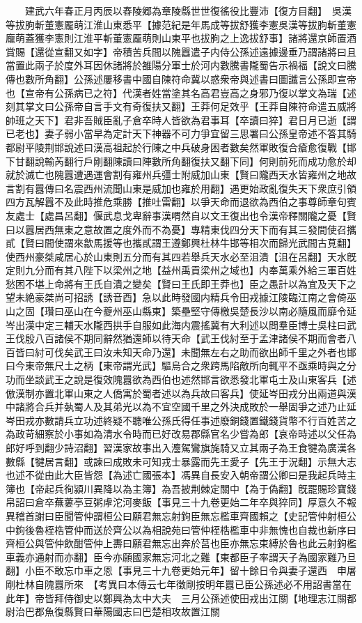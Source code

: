 　　建武六年春正月丙辰以舂陵郷為章陵縣世世復徭役比豐沛【復方目翻】　吳漢等拔胊斬董憲龎萌江淮山東悉平【據范紀是年馬成等拔舒獲李憲吳漢等拔朐斬董憲龐萌蓋獲李憲則江淮平斬董憲龎萌則山東平也拔胊之上逸拔舒事】諸將還京師置酒賞賜【還從宣翻又如字】帝積苦兵間以隗囂遣子内侍公孫述遠據邊垂乃謂諸將曰且當置此兩子於度外耳因休諸將於雒陽分軍士於河内數騰書隴蜀告示禍福【說文曰騰傳也數所角翻】公孫述屢移書中國自陳符命冀以惑衆帝與述書曰圖讖言公孫即宣帝也【宣帝有公孫病已之符】代漢者姓當塗其名高君豈高之身邪乃復以掌文為瑞【述刻其掌文曰公孫帝自言手文有奇復扶又翻】王莽何足效乎【王莽自陳符命遣五威將帥班之天下】君非吾賊臣亂子倉卒時人皆欲為君事耳【卒讀曰猝】君日月已逝【謂已老也】妻子弱小當早為定計天下神器不可力爭宜留三思署曰公孫皇帝述不答其騎都尉平陵荆邯說述曰漢高祖起於行陳之中兵破身困者數矣然軍敗復合瘡愈復戰【邯下甘翻說輸芮翻行戶剛翻陳讀曰陣數所角翻復扶又翻下同】何則前死而成功愈於却就於滅亡也隗囂遭遇運會割有雍州兵彊士附威加山東【賢曰隴西天水皆雍州之地故言割有囂傳曰名震西州流聞山東是威加也雍於用翻】遇更始政亂復失天下衆庶引領四方瓦解囂不及此時推危乘勝【推吐雷翻】以爭天命而退欲為西伯之事尊師章句賓友處士【處昌呂翻】偃武息戈卑辭事漢喟然自以文王復出也令漢帝釋關隴之憂【賢曰以囂居西無東之意故置之度外而不為憂】專精東伐四分天下而有其三發間使召攜貳【賢曰間使謂來歙馬援等也攜貳謂王遵鄭興杜林牛邯等相次而歸光武間古莧翻】使西州豪桀咸居心於山東則五分而有其四若舉兵天水必至沮潰【沮在呂翻】天水旣定則九分而有其八陛下以梁州之地【益州禹貢梁州之域也】内奉萬乘外給三軍百姓愁困不堪上命將有王氏自潰之變矣【賢曰王氏即王莽也】臣之愚計以為宜及天下之望未絶豪桀尚可招誘【誘音酉】急以此時發國内精兵令田戎據江陵臨江南之會倚巫山之固【瓚曰巫山在今夔州巫山縣東】築壘堅守傳檄吳楚長沙以南必隨風而靡令延岑出漢中定三輔天水隴西拱手自服如此海内震搖冀有大利述以問羣臣博士吳柱曰武王伐殷八百諸侯不期同辭然猶還師以待天命【武王伐紂至于孟津諸侯不期而會者八百皆曰紂可伐矣武王曰汝未知天命乃還】未聞無左右之助而欲出師千里之外者也邯曰今東帝無尺土之柄【東帝謂光武】驅烏合之衆跨馬陷敵所向輒平不亟乘時與之分功而坐談武王之說是復效隗囂欲為西伯也述然邯言欲悉發北軍屯士及山東客兵【述倣漢制亦置北軍山東之人僑寓於蜀者述以為兵故曰客兵】使延岑田戎分出兩道與漢中諸將合兵并埶蜀人及其弟光以為不宜空國千里之外決成敗於一舉固爭之述乃止延岑田戎亦數請兵立功述終疑不聽唯公孫氏得任事述廢銅錢置鐵錢貨幣不行百姓苦之為政苛細察於小事如為清水令時而已好改易郡縣官名少嘗為郎【哀帝時述以父任為郎好呼到翻少詩沼翻】習漢家故事出入灋駕鸞旗旄騎又立其兩子為王食犍為廣漢各數縣【犍居言翻】或諫曰成敗未可知戎士暴露而先王愛子【先王于況翻】示無大志也述不從由此大臣皆怨【為述亡國張本】馮異自長安入朝帝謂公卿曰是我起兵時主簿也【帝起兵徇潁川異降以為主簿】為吾披荆棘定關中【為于偽翻】旣罷賜珍寶錢帛詔曰倉卒蕪蔞亭豆粥虖沱河麥飯【事見三十九卷更始二年卒與猝同】厚意久不報異稽首謝曰臣聞管仲謂桓公曰願君無忘射鉤臣無忘檻車齊國賴之【史記管仲射桓公中鉤後魯桎梏管仲而送於齊公以為相說苑曰管仲桎梏檻車中非無愧也自裁也新序曰齊桓公與管仲飲酣管仲上夀曰願君無忘出奔於莒也臣亦無忘束縛於魯也此云射鉤檻車義亦通射而亦翻】臣今亦願國家無忘河北之難【東都臣子率謂天子為國家難乃旦翻】小臣不敢忘巾車之恩【事見三十九卷更始元年】留十餘日令與妻子還西　申屠剛杜林自隗囂所來　【考異曰本傳云七年徵剛按明年囂已臣公孫述必不用詔書當在此年】帝皆拜侍御史以鄭興為太中大夫　三月公孫述使田戎出江關【地理志江關都尉治巴郡魚復縣賢曰華陽國志曰巴楚相攻故置江關